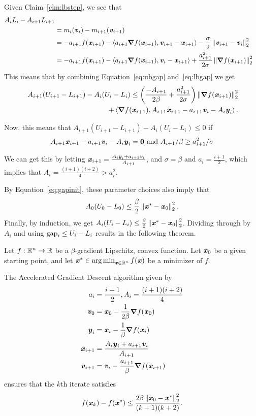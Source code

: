 Given Claim~\ref{clm:lbstep}, we see that
\begin{align}
 \nonumber
A_iL_i-A_{i+1}L_{i+1}
\\
&= m_{i}(\vv_i)  - m_{i+1}(\vv_{i+1})
\\
&=
-  a_{i+1}  f(\xx_{i+1})
-  \ip{ a_{i+1}\grad
 f(\xx_{i+1}) ,\vv_{i+1} - \xx_{i+1}}
-
\frac{\sigma}{2} \norm{ \vv_{i+1} -
  \vv_i}_2^2
\\
&=
-  a_{i+1}  f(\xx_{i+1})
-  \ip{ a_{i+1}\grad f(\xx_{i+1}) ,\vv_{i} - \xx_{i+1}}
+
  \frac{a_{i+1}^2}{2\sigma} \norm{ \grad f(\xx_{i+1})}_2^2
  \label{eq:lbgap}
\end{align}
This means that by combining Equation~\eqref{eq:ubgap}
and~\eqref{eq:lbgap} we get
\begin{align*}
 \
 A_{i+1}( U_{i+1} - L_{i+1})
-
 A_{i}( U_{i} - L_{i})
 \leq
 \left(
 \frac{-A_{i+1}}{2\beta}
 +
\frac{a_{i+1}^2}{2\sigma}
 \right)
 \left\|  \boldsymbol{\nabla} f(\boldsymbol{\mathit{x}}_{i+1}) \right\|_2^2
 \\
 +  \left< \boldsymbol{\nabla} f(\boldsymbol{\mathit{x}}_{i+1}) ,
 A_{i+1} \boldsymbol{\mathit{x}}_{i+1}
 - a_{i+1} \boldsymbol{\mathit{v}}_{i}
 - A_{i} \boldsymbol{\mathit{y}}_{i} \right>
 .
\end{align*}

Now, this means that $ A_{i+1}( U_{i+1} - L_{i+1}) - A_{i}( U_{i} -
L_{i}) \leq 0$ if
\[
  A_{i+1} \boldsymbol{\mathit{x}}_{i+1}
 - a_{i+1} \boldsymbol{\mathit{v}}_{i}
 - A_{i} \boldsymbol{\mathit{y}}_{i} = \boldsymbol{0}
\text{ and }
A_{i+1}/\beta \geq  a_{i+1}^2/\sigma
\]

We can get this by letting
$\boldsymbol{\mathit{x}}_{i+1} = \frac{
A_{i} \boldsymbol{\mathit{y}}_{i} + a_{i+1} \boldsymbol{\mathit{v}}_{i}
}{A_{i+1}}
$, and $\sigma = \beta$ and $a_i = \frac{i+1}{2}$,
which implies that $A_i = \frac{(i+1)(i+2)}{4} > a_i^2$.



By Equation~\eqref{eq:gapinit}, these parameter choices also imply
that
\[
 A_0 (U_0 - L_0) \leq \frac{\beta }{2}\left\|  \boldsymbol{\mathit{x}}^* - \boldsymbol{\mathit{x}}_0 \right\|_2^2  .
\]
Finally, by induction, we get
$ A_{i}( U_{i} - L_{i})  \leq  \frac{\beta }{2}\left\|  \boldsymbol{\mathit{x}}^* -
 \boldsymbol{\mathit{x}}_0 \right\|_2^2$.
Dividing through by $A_i$ and using $\text{gap}_i \leq  U_{i} - L_{i}$
results in the following theorem.
\begin{theorem}
 Let $f : \mathbb{R}^n \to \mathbb{R}$ be a $\beta$-gradient Lipschitz, convex
 function.
 Let $\boldsymbol{\mathit{x}}_0$ be a given starting point,
 and let $\boldsymbol{\mathit{x}}^* \in \operatorname*{arg\,min}_{\boldsymbol{\mathit{x}} \in \mathbb{R}^n} f(\boldsymbol{\mathit{x}})$ be a minimizer of
 $f$.

The Accelerated Gradient Descent algorithm given by
\begin{align*}
 a_i &= \frac{i+1}{2}, A_i = \frac{(i+1)(i+2)}{4}     \\
\boldsymbol{\mathit{v}}_0 & = \boldsymbol{\mathit{x}}_0 - \frac{1}{2\beta} \boldsymbol{\nabla} f(\boldsymbol{\mathit{x}}_0) \\
 \boldsymbol{\mathit{y}}_{i} &= \boldsymbol{\mathit{x}}_{i} - \frac{1}{\beta} \boldsymbol{\nabla} f(\boldsymbol{\mathit{x}}_{i}) \\
 \boldsymbol{\mathit{x}}_{i+1} &=  \frac{
A_{i} \boldsymbol{\mathit{y}}_{i} + a_{i+1} \boldsymbol{\mathit{v}}_{i}
           }{A_{i+1}} \\
 \boldsymbol{\mathit{v}}_{i+1} &= \boldsymbol{\mathit{v}}_{i}  - \frac{a_{i+1}}{\beta} \boldsymbol{\nabla} f(\boldsymbol{\mathit{x}}_{i+1})
\end{align*}
ensures that the $k$th iterate satisfies
\[
  f(\boldsymbol{\mathit{x}}_{k}) - f(\boldsymbol{\mathit{x}}^*)\leq \frac{2 \beta \left\| \boldsymbol{\mathit{x}}_0 - \boldsymbol{\mathit{x}}^* \right\|_2^2}{(k+1)(k+2)}
  .
\]
\end{theorem}




%


